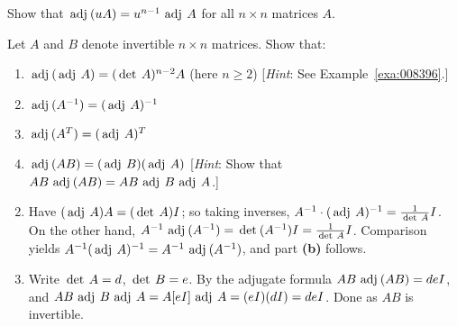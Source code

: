 \begin{multicols}{2}
\columnbreak
\begin{ex}
Show that $\func{adj}(uA) = u^{n-1} \func{adj }A$ for all $n \times n$ matrices $A$.
\end{ex}

\begin{ex}
Let $A$ and $B$ denote invertible $n \times n$ matrices. Show that:


\begin{enumerate}[label={\alph*.}]
\item $\func{adj}(\func{adj }A) = (\func{det }A)^{n-2}A$ (here $n \geq 2$) [\textit{Hint}: See Example~\ref{exa:008396}.]

\item $\func{adj}(A^{-1}) = (\func{adj }A)^{-1}$

\item $\func{adj}(A^{T}) = (\func{adj }A)^T$

\item $\func{adj}(AB) = (\func{adj }B)(\func{adj }A)$ [\textit{Hint}: Show that $AB \func{adj}(AB) = AB \func{adj }B \func{adj }A$.]

\end{enumerate}
\begin{sol}
\begin{enumerate}[label={\alph*.}]
\setcounter{enumi}{1}
\item  Have $(\func{adj }A)A = (\func{det }A)I$; so taking inverses, $A^{-1} \cdot (\func{adj } A)^{-1} = \frac{1}{\func{det } A}I$.
 On the other hand, $A^{-1} \func{adj} (A^{-1}) = \func{det}(A^{-1})I = \frac{1}{\func{det } A}I$.
 Comparison yields $A^{-1}(\func{adj }A)^{-1} = A^{-1}\func{adj}(A^{-1})$, and part \textbf{(b)} follows.

\setcounter{enumi}{3}
\item  Write $\func{det} A = d$, $\func{det } B = e$. By the adjugate formula $AB \func{adj}(AB) = deI$, and $AB \func{adj }B \func{adj }A = A[eI] \func{adj} A = (eI)(dI) = deI$. Done as $AB$ is invertible.

\end{enumerate}
\end{sol}
\end{ex}

\end{multicols}




